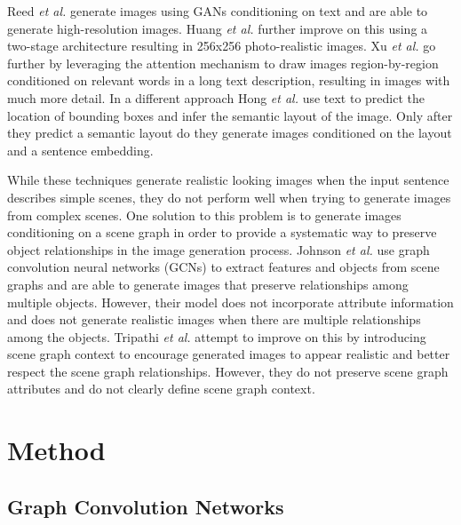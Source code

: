 \documentclass{article}
\begin{document}
Reed \textit{et al.} \cite{t2im} generate images using GANs conditioning on text and are able to generate high-resolution images. Huang \textit{et al.} \cite{stackedgan} further improve on this using a two-stage architecture resulting in 256x256 photo-realistic images. Xu \textit{et al.} \cite{attengan} go further by leveraging the attention mechanism to draw images region-by-region conditioned on relevant words in a long text description, resulting in images with much more detail. In a different approach Hong \textit{et al.} \cite{scenelayout} use text to predict the location of bounding boxes and infer the semantic layout of the image. Only after they predict a semantic layout do they generate images conditioned on the layout and a sentence embedding.

While these techniques generate realistic looking images when the input sentence describes simple scenes, they do not perform well when trying to generate images from complex scenes. One solution to this problem is to generate images conditioning on a scene graph in order to provide a systematic way to preserve object relationships in the image generation process. Johnson \textit{et al.} \cite{sg2im} use graph convolution neural networks (GCNs) to extract features and objects from scene graphs and are able to generate images that preserve relationships among multiple objects. However, their model does not incorporate attribute information and does not generate realistic images when there are multiple relationships among the objects. Tripathi \textit{et al.} \cite{sg2imgcontext} attempt to improve on this by introducing scene graph context to encourage generated images to appear realistic and better respect the scene graph relationships. However, they do not preserve scene graph attributes and do not clearly define scene graph context.

\section{Method}

\subsection{Graph Convolution Networks}
\end{document}
